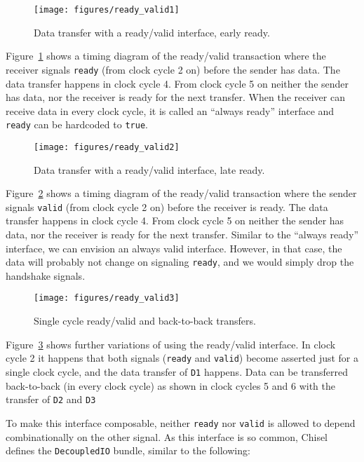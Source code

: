 \documentclass[%
    10pt,
    headinclude, footexclude,
    openright, %
    notitlepage,
    cleardoubleempty,
    headsepline,
    pointlessnumbers,
    bibtotoc, idxtotoc,
    ]{scrbook}
\newcommand{\code}[1]{{\lstinline[basicstyle=\small\ttfamily]{#1}}}
\begin{document}
\begin{figure}
  \centering
  \texttt{[image: figures/ready\_valid1]}
  \caption{Data transfer with a ready/valid interface, early ready.}
  \label{fig:ready_valid1}
\end{figure}

Figure~\ref{fig:ready_valid1} shows a timing diagram of the ready/valid
transaction where the receiver signals \code{ready} (from clock cycle 2 on)
before the sender has data. The data transfer happens in clock cycle 4.
From clock cycle 5 on neither the sender has data, nor the receiver is ready
for the next transfer.
When the receiver can receive data in every clock cycle, it is called an
``always ready'' interface and \code{ready} can be hardcoded to \code{true}.

\begin{figure}
  \centering
  \texttt{[image: figures/ready\_valid2]}
  \caption{Data transfer with a ready/valid interface, late ready.}
  \label{fig:ready_valid2}
\end{figure}

Figure~\ref{fig:ready_valid2} shows a timing diagram of the ready/valid
transaction where the sender signals \code{valid} (from clock cycle 2 on)
before the receiver is ready. The data transfer happens in clock cycle 4.
From clock cycle 5 on neither the sender has data, nor the receiver is ready
for the next transfer.
Similar to the ``always ready'' interface, we can envision an always valid
interface. However, in that case, the data will probably not change on signaling
\code{ready}, and we would simply drop the handshake signals.

\begin{figure}
  \centering
  \texttt{[image: figures/ready\_valid3]}
  \caption{Single cycle ready/valid and back-to-back transfers.}
  \label{fig:ready_valid3}
\end{figure}

Figure~\ref{fig:ready_valid3} shows further variations of using the ready/valid
interface. In clock cycle 2 it happens that both signals (\code{ready} and \code{valid})
become asserted just for a single clock cycle, and the data transfer
of \code{D1} happens. Data can be transferred back-to-back (in every
clock cycle) as shown in clock cycles 5 and 6 with the transfer of
\code{D2} and \code{D3}

To make this interface composable, neither \code{ready} nor \code{valid} is
allowed to depend combinationally on the other signal.
As this interface is so common, Chisel defines the \code{DecoupledIO}
bundle, similar to the following:
\end{document}
